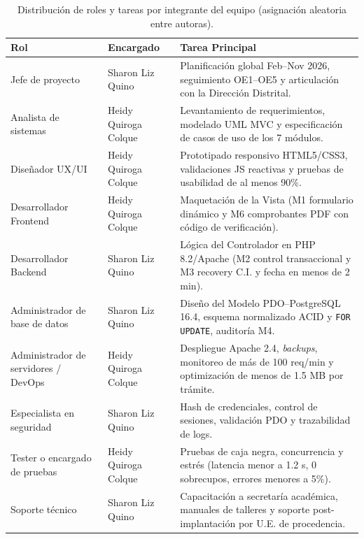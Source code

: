 \begin{table}[htbp]
    \centering
    \caption{Distribución de roles y tareas por integrante del equipo (asignación aleatoria entre autoras).}
    \label{tab:recursos_humanos_roles}
    \small
    \begin{tabularx}{\textwidth}{>{\hsize}L >{\hsize}L >{\hsize}L}
        \toprule
        \textbf{Rol} & \textbf{Encargado} & \textbf{Tarea Principal} \\
        \midrule
        Jefe de proyecto & Sharon Liz Quino & Planificación global Feb--Nov 2026, seguimiento OE1--OE5 y articulación con la Dirección Distrital. \\
        \addlinespace
        Analista de sistemas & Heidy Quiroga Colque & Levantamiento de requerimientos, modelado UML MVC y especificación de casos de uso de los 7 módulos. \\
        \addlinespace
        Diseñador UX/UI & Heidy Quiroga Colque & Prototipado responsivo HTML5/CSS3, validaciones JS reactivas y pruebas de usabilidad de al menos 90\%. \\
        \addlinespace
        Desarrollador Frontend & Heidy Quiroga Colque & Maquetación de la Vista (M1 formulario dinámico y M6 comprobantes PDF con código de verificación). \\
        \addlinespace
        Desarrollador Backend & Sharon Liz Quino & Lógica del Controlador en PHP 8.2/Apache (M2 control transaccional y M3 recovery C.I. y fecha en menos de 2 min). \\
        \addlinespace
        Administrador de base de datos & Sharon Liz Quino & Diseño del Modelo PDO--PostgreSQL 16.4, esquema normalizado ACID y \texttt{FOR UPDATE}, auditoría M4. \\
        \addlinespace
        Administrador de servidores / DevOps & Heidy Quiroga Colque & Despliegue Apache 2.4, \textit{backups}, monitoreo de más de 100 req/min y optimización de menos de 1.5 MB por trámite. \\
        \addlinespace
        Especialista en seguridad & Sharon Liz Quino & Hash de credenciales, control de sesiones, validación PDO y trazabilidad de logs. \\
        \addlinespace
        Tester o encargado de pruebas & Heidy Quiroga Colque & Pruebas de caja negra, concurrencia y estrés (latencia menor a 1.2 s, 0 sobrecupos, errores menores a 5\%). \\
        \addlinespace
        Soporte técnico & Sharon Liz Quino & Capacitación a secretaría académica, manuales de talleres y soporte post-implantación por U.E. de procedencia. \\
        \bottomrule
    \end{tabularx}
\end{table}
